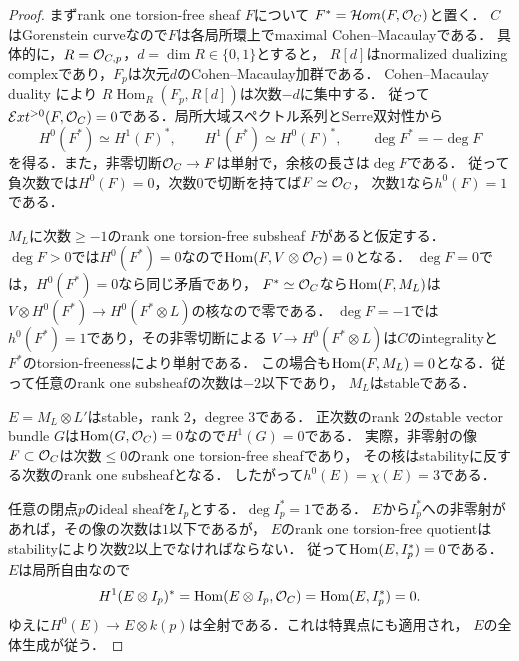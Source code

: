 \documentclass[11pt,a4paper]{ltjsarticle}
\begin{document}
\begin{proof}
まずrank one torsion-free sheaf $F$について
$F^*=\mathcal Hom(F,\mathcal O_C)$と置く．
$C$はGorenstein curveなので$F$は各局所環上でmaximal Cohen--Macaulayである．
具体的に，$R=\mathcal O_{C,p}$，$d=\dim R\in\{0,1\}$とすると，
$R[d]$はnormalized dualizing complexであり，$F_p$は次元$d$のCohen--Macaulay加群である．
Cohen--Macaulay duality \cite[Tag 0B5A, Lemma 47.16.7]{Stacks} により
$R\!\operatorname{Hom}_R(F_p,R[d])$は次数$-d$に集中する．
従って$\mathcal Ext^{>0}(F,\mathcal O_C)=0$である．局所大域スペクトル系列とSerre双対性から
\[
 H^0(F^*)\simeq H^1(F)^*,\qquad
 H^1(F^*)\simeq H^0(F)^*,\qquad
 \deg F^*=-\deg F
\]
を得る．また，非零切断$\mathcal O_C\to F$は単射で，余核の長さは$\deg F$である．
従って負次数では$H^0(F)=0$，次数0で切断を持てば$F\simeq\mathcal O_C$，
次数1なら$h^0(F)=1$である．

$M_L$に次数$\geq-1$のrank one torsion-free subsheaf $F$があると仮定する．
$\deg F>0$では$H^0(F^*)=0$なので$\operatorname{Hom}(F,V\otimes\mathcal O_C)=0$となる．
$\deg F=0$では，$H^0(F^*)=0$なら同じ矛盾であり，
$F^*\simeq\mathcal O_C$なら$\operatorname{Hom}(F,M_L)$は
$V\otimes H^0(F^*)\to H^0(F^*\otimes L)$の核なので零である．
$\deg F=-1$では$h^0(F^*)=1$であり，その非零切断による
$V\to H^0(F^*\otimes L)$は$C$のintegralityと$F^*$のtorsion-freenessにより単射である．
この場合も$\operatorname{Hom}(F,M_L)=0$となる．従って任意のrank one subsheafの次数は$-2$以下であり，
$M_L$はstableである．

$E=M_L\otimes L'$はstable，rank $2$，degree $3$である．
正次数のrank $2$のstable vector bundle $G$は$\operatorname{Hom}(G,\mathcal O_C)=0$なので$H^1(G)=0$である．
実際，非零射の像$F\subset\mathcal O_C$は次数$\leq0$のrank one torsion-free sheafであり，
その核はstabilityに反する次数のrank one subsheafとなる．
したがって$h^0(E)=\chi(E)=3$である．

任意の閉点$p$のideal sheafを$I_p$とする．$\deg I_p^*=1$である．
$E$から$I_p^*$への非零射があれば，その像の次数は$1$以下であるが，
$E$のrank one torsion-free quotientはstabilityにより次数$2$以上でなければならない．
従って$\operatorname{Hom}(E,I_p^*)=0$である．$E$は局所自由なので
\[
 H^1(E\otimes I_p)^*
 =\operatorname{Hom}(E\otimes I_p,\mathcal O_C)
 =\operatorname{Hom}(E,I_p^*)=0.
\]
ゆえに$H^0(E)\to E\otimes k(p)$は全射である．これは特異点にも適用され，
$E$の全体生成が従う．
\end{proof}
\end{document}
